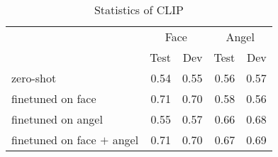 \begin{table}[htb!]
\begin{minipage}{1\textwidth}
\begin{center}
{\small
\begin{tabular}{lrrrr}
\toprule
& \multicolumn{2}{c}{Face} & \multicolumn{2}{c}{Angel}\\
~ & Test & Dev & Test & Dev \\
\midrule
zero-shot & 0.54 & 0.55 & 0.56 & 0.57 \\
finetuned on face & 0.71 & 0.70 & 0.58 & 0.56 \\
finetuned on angel & 0.55 & 0.57 & 0.66 & 0.68 \\
finetuned on face $+$ angel & 0.71 & 0.70 & 0.67 & 0.69
\bottomrule
\end{tabular}}
\caption{Statistics of CLIP}
\label{clip_results_table.single_acc}
\end{center}
\end{minipage}
\end{table}